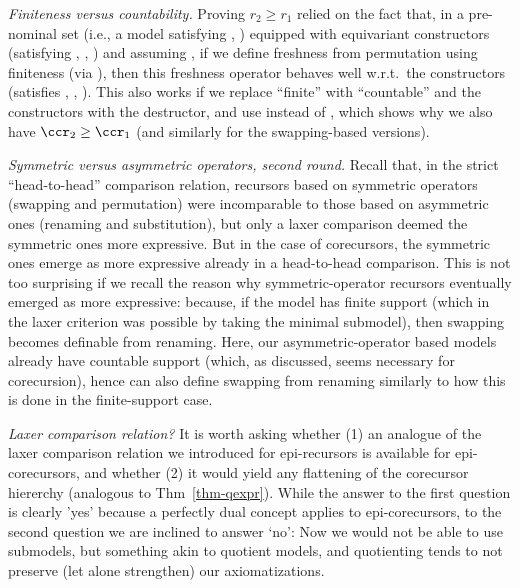 \emph{Finiteness versus countability.}  Proving $r_2 \geq r_1$ relied on the fact that, in a pre-nominal set (i.e., a model satisfying \PmId{}, \PmCp{}) equipped with equivariant constructors (satisfying \PmVr{}, \PmAp{}, \PmLm{}) and assuming \FCB{}, if we define freshness from permutation using finiteness (via \FvDPm{}), then this freshness operator behaves well w.r.t.\ the constructors (satisfies \FrVr{}, \FrAp{}, \FrLm{}).  
This also works if we replace ``finite'' with ``countable'' and the constructors with the destructor, and use \IPmBvr{} instead of \FCB{}, which shows why we also have $\ccr_2\geq \ccr_1$ 
(and similarly for the swapping-based versions). 

\emph{Symmetric versus asymmetric operators, second round.} 
%
Recall that, in the strict ``head-to-head'' comparison relation, recursors based on 
symmetric operators (swapping and permutation) 
were incomparable to those based on 
asymmetric ones (renaming and  substitution), but only a laxer comparison 
deemed the symmetric ones more expressive. 
%
But in the case of corecursors, the symmetric ones emerge as more expressive already in a head-to-head comparison. This is not too surprising if we %
recall the reason why symmetric-operator recursors  eventually %
emerged as more expressive: because, if the model has finite support (which in the laxer criterion was possible by taking the minimal submodel), then swapping becomes definable from renaming. 
Here, our asymmetric-operator based models already have countable support (which, as discussed, seems necessary for corecursion), hence can also define swapping from renaming similarly to how this is done in the finite-support case.  


\emph{Laxer comparison relation?} It is worth asking whether (1) an analogue of the laxer comparison relation we introduced for epi-recursors is available for epi-corecursors, and whether (2) it would yield any 
flattening of the corecursor hiererchy 
(analogous to Thm~\ref{thm-qexpr}). While the answer to the first question is clearly 'yes' because a perfectly dual concept applies to epi-corecursors, 
to the second question we are inclined to answer 
`no': 
Now we would not be able to use submodels, but something akin to quotient models, and %
quotienting tends to not preserve (let alone strengthen) 
our axiomatizations. 


